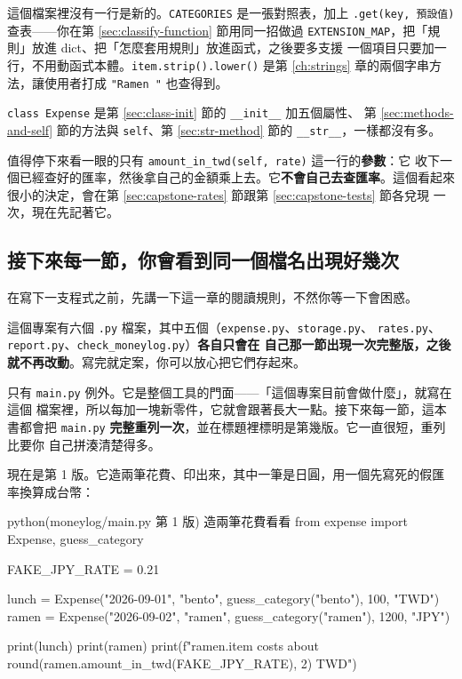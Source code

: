 這個檔案裡沒有一行是新的。\texttt{CATEGORIES} 是一張對照表，加上
\texttt{.get(key, 預設值)} 查表——你在第 \ref{sec:classify-function} 節用同一招做過
\texttt{EXTENSION\_MAP}，把「規則」放進 dict、把「怎麼套用規則」放進函式，之後要多支援
一個項目只要加一行，不用動函式本體。\texttt{item.strip().lower()} 是第 \ref{ch:strings}
章的兩個字串方法，讓使用者打成 \texttt{"Ramen "} 也查得到。

\texttt{class Expense} 是第 \ref{sec:class-init} 節的 \texttt{\_\_init\_\_} 加五個屬性、
第 \ref{sec:methods-and-self} 節的方法與 \texttt{self}、第 \ref{sec:str-method} 節的
\texttt{\_\_str\_\_}，一樣都沒有多。

值得停下來看一眼的只有 \texttt{amount\_in\_twd(self, rate)} 這一行的\textbf{參數}：它
收下一個已經查好的匯率，然後拿自己的金額乘上去。它\textbf{不會自己去查匯率}。這個看起來
很小的決定，會在第 \ref{sec:capstone-rates} 節跟第 \ref{sec:capstone-tests} 節各兌現
一次，現在先記著它。

\subsection*{接下來每一節，你會看到同一個檔名出現好幾次}

在寫下一支程式之前，先講一下這一章的閱讀規則，不然你等一下會困惑。

這個專案有六個 \texttt{.py} 檔案，其中五個（\texttt{expense.py}、\texttt{storage.py}、
\texttt{rates.py}、\texttt{report.py}、\texttt{check\_moneylog.py}）\textbf{各自只會在
自己那一節出現一次完整版，之後就不再改動}。寫完就定案，你可以放心把它們存起來。

只有 \texttt{main.py} 例外。它是整個工具的門面——「這個專案目前會做什麼」，就寫在這個
檔案裡，所以每加一塊新零件，它就會跟著長大一點。接下來每一節，這本書都會把
\texttt{main.py} \textbf{完整重列一次}，並在標題裡標明是第幾版。它一直很短，重列比要你
自己拼湊清楚得多。

現在是第 1 版。它造兩筆花費、印出來，其中一筆是日圓，用一個先寫死的假匯率換算成台幣：

\begin{example}{python}{(moneylog/main.py 第 1 版) 造兩筆花費看看}
from expense import Expense, guess_category

FAKE_JPY_RATE = 0.21

lunch = Expense("2026-09-01", "bento", guess_category("bento"), 100, "TWD")
ramen = Expense("2026-09-02", "ramen", guess_category("ramen"), 1200, "JPY")

print(lunch)
print(ramen)
print(f"{ramen.item} costs about {round(ramen.amount_in_twd(FAKE_JPY_RATE), 2)} TWD")
\end{example}

